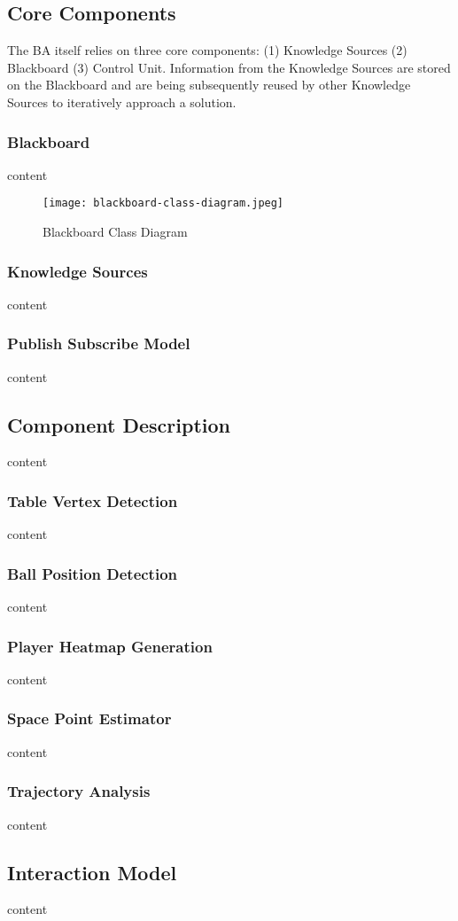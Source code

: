 \documentclass[conference]{IEEEtran}
\begin{document}
\subsection{Core Components}
The BA itself relies on three core components: (1) Knowledge Sources (2) Blackboard (3) Control Unit. Information from the Knowledge Sources are stored on the Blackboard and are being subsequently reused by other Knowledge Sources to iteratively approach a solution. 
\subsubsection{Blackboard}
content
\begin{figure}
    \centering
    \texttt{[image: blackboard-class-diagram.jpeg]}
    \caption{Blackboard Class Diagram}
    \label{fig:placeholder}
\end{figure}
\subsubsection{Knowledge Sources}
content
\subsubsection{Publish Subscribe Model}
content
\subsection{Component Description}
content
\subsubsection{Table Vertex Detection}
content
\subsubsection{Ball Position Detection}
content
\subsubsection{Player Heatmap Generation}
content
\subsubsection{Space Point Estimator}
content
\subsubsection{Trajectory Analysis}
content
\subsection{Interaction Model}
content
\end{document}
